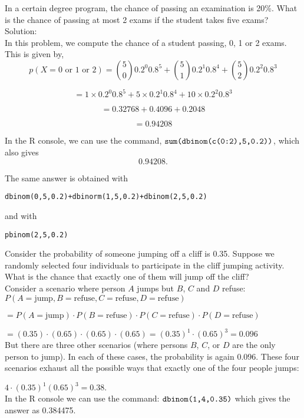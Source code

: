 \documentclass[12pt,a4paper]{article}
\theoremstyle{regla}
\theoremstyle{remark}
\theoremstyle{definition}
\theoremstyle{nonumberbreak}
\begin{document}
\begin{xmpl} 

In a certain degree program, the chance of passing an examination is 20\%. What is the chance of passing at most 2 exams if the student takes five exams?\\

Solution:\\
In this problem, we compute the chance of a student passing, 0, 1 or 2 exams. This is given by, 
$$p(X=0 \text{ or }1 \text{ or }2)={5\choose 0}0.2^0 0.8^5 +{5\choose 1}0.2^1 0.8^4 +{5\choose 2}0.2^2 0.8^3 $$

$$=1\times0.2^0 0.8^5 +5\times 0.2^1 0.8^4 +10\times0.2^2 0.8^3 $$

$$=0.32768+0.4096+0.2048$$

$$=0.94208$$

In the R console, we can use the command,
$\verb|sum(dbinom(c(0:2),5,0.2))|$,
which also gives $$0.94208.$$

The same answer is obtained with

\begin{lstlisting}
dbinom(0,5,0.2)+dbinorm(1,5,0.2)+dbinom(2,5,0.2)
\end{lstlisting}

and with
\begin{lstlisting}
pbinom(2,5,0.2)
\end{lstlisting}

\end{xmpl} 
\begin{xmpl} 

Consider the probability of someone jumping off a cliff is 0.35. Suppose we randomly selected four individuals to participate in the cliff jumping activity.
What is the chance that exactly one of them will jump off the cliff?\\

Consider a scenario where person $A$ jumps but $B$, $C$ and $D$ refuse:\\
$P (A = \text{jump} , B = \text{refuse}, C = \text{refuse}, D = \text{refuse})$

$= P (A =\text{jump}) \cdot P (B = \text{refuse}) \cdot P (C = \text{refuse}) \cdot P (D = \text{refuse})$

$= (0.35) \cdot (0.65) \cdot (0.65) \cdot (0.65) = (0.35)^1 \cdot  (0.65)^3 = 0.096$\\

But there are three other scenarios (where persons $B$, $C$, or $D$ are the only person to jump). In each of these cases, the probability is again 0.096. These four scenarios exhaust all the possible ways that exactly one of the four people jumps:

$4 \cdot (0.35)^1 (0.65)^3 = 0.38.$\\

In the R console we can use the command:
$\verb|dbinom(1,4,0.35)|$
which gives the answer as  0.384475.
\end{xmpl} 
\end{document}
